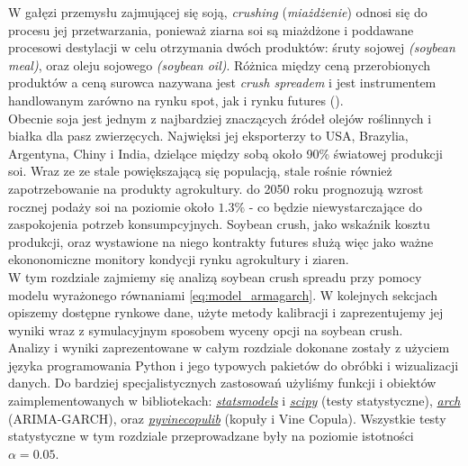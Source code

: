 W gałęzi przemysłu zajmującej się soją, \emph{crushing} (\emph{miażdżenie}) odnosi się do procesu jej przetwarzania, ponieważ ziarna soi są miażdżone i poddawane procesowi destylacji w celu otrzymania dwóch produktów: śruty sojowej \emph{(soybean meal)}, oraz oleju sojowego \emph{(soybean oil)}. Różnica między ceną przerobionych produktów a ceną surowca nazywana jest \emph{crush spreadem} i jest instrumentem handlowanym zarówno na rynku spot, jak i rynku futures (\cite{CME_soybean}).\\
Obecnie soja jest jednym z najbardziej znaczących źródeł olejów roślinnych i białka dla pasz zwierzęcych. Najwięksi jej eksporterzy to USA, Brazylia, Argentyna, Chiny i India, dzielące między sobą około 90\% światowej produkcji soi. Wraz ze ze stale powiększającą się populacją, stale rośnie również zapotrzebowanie na produkty agrokultury. \cite{Pagano_Soybean_importance} do 2050 roku prognozują wzrost rocznej podaży soi na poziomie około $1.3\%$ - co będzie niewystarczające do zaspokojenia potrzeb konsumpcyjnych. Soybean crush, jako wskaźnik kosztu produkcji, oraz wystawione na niego kontrakty futures służą więc jako ważne ekononomiczne monitory kondycji rynku agrokultury i ziaren.\\

W tym rozdziale zajmiemy się analizą soybean crush spreadu przy pomocy modelu wyrażonego równaniami \ref{eq:model_armagarch}. W kolejnych sekcjach opiszemy dostępne rynkowe dane, użyte metody kalibracji i zaprezentujemy jej wyniki wraz z symulacyjnym sposobem wyceny opcji na soybean crush.\\
Analizy i wyniki zaprezentowane w całym rozdziale dokonane zostały z użyciem języka programowania Python i jego typowych pakietów do obróbki i wizualizacji danych. Do bardziej specjalistycznych zastosowań użyliśmy funkcji i obiektów zaimplementowanych w bibliotekach: \href{https://www.statsmodels.org/stable/index.html}{\emph{statsmodels}} i \href{https://docs.scipy.org/doc/scipy/}{\emph{scipy}} (testy statystyczne), \href{https://arch.readthedocs.io/en/latest/univariate/introduction.html}{\emph{arch}} (ARIMA-GARCH), oraz \href{https://vinecopulib.github.io/pyvinecopulib/}{\emph{pyvinecopulib}} (kopuły i Vine Copula). Wszystkie testy statystyczne w tym rozdziale przeprowadzane były na poziomie istotności $\alpha = 0.05$.
